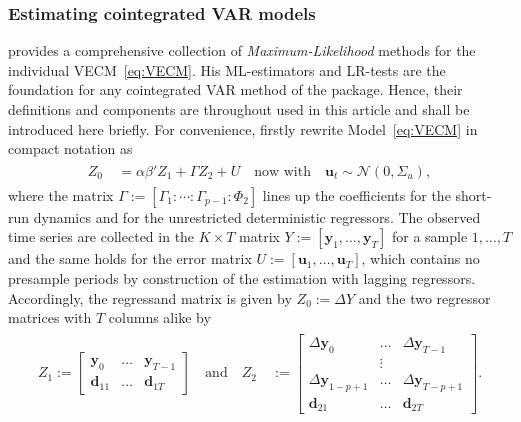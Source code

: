 \subsubsection{Estimating cointegrated VAR models} \label{sec:IndivEst}
\citet{Johansen1991,Johansen1996} provides a comprehensive collection of \textit{Maximum-Likelihood} methods for the individual VECM~\eqref{eq:VECM}. His ML-estimators and LR-tests are the foundation for any cointegrated VAR method of the  package. Hence, their definitions and components are throughout used in this article and shall be introduced here briefly. For convenience, firstly rewrite Model~\eqref{eq:VECM} in compact notation as
\begin{align} \label{eq:compactVECM}
\begin{split}
	Z_{0} \ & = \alpha\beta' Z_{1} + \Gamma Z_{2} + U \quad \text{now with} \quad \boldsymbol{u}_{t} \sim \mathcal{N}(0,\Sigma_u),
\end{split}
\end{align}
where the matrix $ \Gamma := \left[ \Gamma_1 : \cdots : \Gamma_{p-1} : \Phi_2 \right] $ lines up the coefficients for the short-run dynamics and for the unrestricted deterministic regressors. The observed time series are collected in the $ K \times T $ matrix $ Y := \left[ \boldsymbol{y}_{1}, \ldots, \boldsymbol{y}_{T} \right] $ for a sample $ 1,\ldots,T $ and the same holds for the error matrix $ U := \left[ \boldsymbol{u}_{1}, \ldots, \boldsymbol{u}_{T} \right] $, which contains no presample periods by construction of the estimation with lagging regressors. Accordingly, the regressand matrix is given by $Z_0 := \Delta Y $ and the two regressor matrices with $ T $ columns alike by
\begin{align} \label{eq:compactRegressor}
\begin{split}
	Z_1 := 
	\begin{bmatrix} 
		\boldsymbol{y}_{0}  & \ldots & \boldsymbol{y}_{T-1} \\ 
		\boldsymbol{d}_{11} & \ldots & \boldsymbol{d}_{1T} 
	\end{bmatrix}
	\quad \text{and} \quad
	Z_{2} \ & := 
	\begin{bmatrix}
		\Delta \boldsymbol{y}_{0}     & \ldots & \Delta \boldsymbol{y}_{T-1} \\
		                              & \vdots &                             \\
		\Delta \boldsymbol{y}_{1-p+1} & \ldots & \Delta \boldsymbol{y}_{T-p+1} \\
		\boldsymbol{d}_{21}           & \ldots & \boldsymbol{d}_{2T}
	\end{bmatrix}.
\end{split}
\end{align} 
